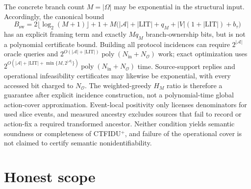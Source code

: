 \documentclass{article}
\begin{document}
The concrete branch count \(M=|\Omega|\) may be exponential in the structural input.  Accordingly, the canonical bound
\[
 B_{\mathrm{sw}}=2\lfloor\log_2(M+1)\rfloor+1+M\bigl(|\mathcal A|+|\mathrm{LIT}|+q_M+|V|(1+|\mathrm{LIT}|)+b_{\tau}\bigr)
\]
has an explicit framing term and exactly \(Mq_M\) branch-ownership bits, but is not a polynomial certificate bound.  Building all protocol incidences can require \(2^{|\mathcal A|}\) oracle queries and \(2^{O(|\mathcal A|+|\mathrm{LIT}|)}\operatorname{poly}(N_{\mathrm{in}}+N_{\mathcal O})\) work; exact optimization uses \(2^{O(|\mathcal A|+|\mathrm{LIT}|+\min\{M,2^{|\mathcal A|}\})}\operatorname{poly}(N_{\mathrm{in}}+N_{\mathcal O})\) time.  Source-support replies and operational infeasibility certificates may likewise be exponential, with every accessed bit charged to \(N_{\mathcal O}\).  The weighted-greedy \(H_M\) ratio is therefore a guarantee after explicit incidence construction, not a polynomial-time global action-cover approximation.  Event-local positivity only licenses denominators for used slice events, and measured ancestry excludes sources that fail to record or action-fix a required transformed ancestor.  Neither condition yields semantic soundness or completeness of CTFIDU\({}^{+}\), and failure of the operational cover is not claimed to certify semantic nonidentifiability.

\section{Honest scope}
\end{document}
